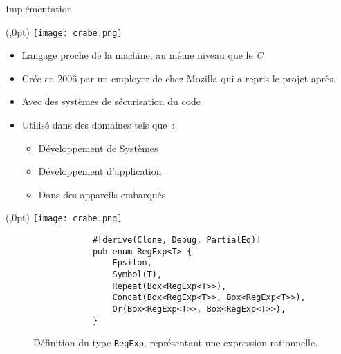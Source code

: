 \documentclass[aspectratio=169,xcolor=dvipsnames]{beamer}
\begin{document}
\begin{frame}{Implémentation}
    \begin{textblock*}{20pt}(\textwidth-70pt,0pt)
        \texttt{[image: crabe.png]}
    \end{textblock*}
    \begin{itemize}
        \item[\textbullet] Langage proche de la machine, au même niveau que le 
        \textit{C}
        \item[\textbullet] Crée en 2006 par un employer de chez Mozilla qui a 
            repris le projet après.
        \item[\textbullet] Avec des systèmes de sécurisation du code
        \item[\textbullet] Utilisé dans des domaines tels que~:
            \begin{itemize}
                \item[\textbullet] Développement de Systèmes
                \item[\textbullet] Développement d'application
                \item[\textbullet] Dans des appareils embarqués
            \end{itemize} 
    \end{itemize}
\end{frame}


\begin{frame}[fragile]
    \begin{textblock*}{20pt}(\textwidth-70pt,0pt)
        \texttt{[image: crabe.png]}
    \end{textblock*}
    \begin{figure}  
        \begin{verbatim}
            #[derive(Clone, Debug, PartialEq)]
            pub enum RegExp<T> {
                Epsilon,
                Symbol(T),
                Repeat(Box<RegExp<T>>),
                Concat(Box<RegExp<T>>, Box<RegExp<T>>),
                Or(Box<RegExp<T>>, Box<RegExp<T>>),
            }
        \end{verbatim}
        \caption{
            Définition du type \texttt{RegExp}, représentant une 
            expression rationnelle.
        }
    \end{figure}  
\end{frame}

\end{document}
